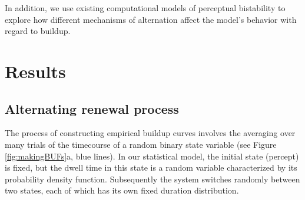 \documentclass{frontiersSCNS} %
\begin{document}
In addition, we use existing computational models of perceptual bistability to explore how different mechanisms of alternation affect the model's behavior with regard to buildup.

\section{Results}
\subsection*{Alternating renewal process}

The process of constructing empirical buildup curves involves the averaging over many trials of the timecourse of a random binary state variable (see Figure \ref{fig:makingBUFs}a, blue lines). In our statistical model, the initial state (percept) is fixed, but the dwell time in this state is a random variable characterized by its probability density function. Subsequently the system switches randomly between two states, each of which has its own fixed duration distribution.
\end{document}
